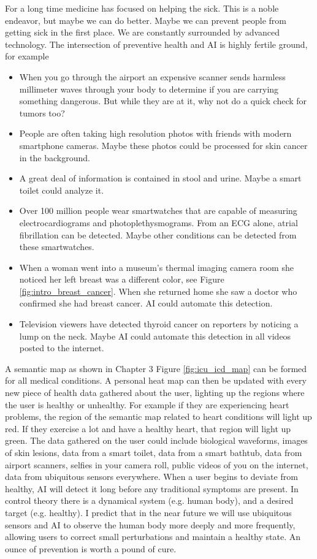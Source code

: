 For a long time medicine has focused on helping the sick.  This is a noble endeavor, but maybe we can do better.  Maybe we can prevent people from getting sick in the first place.  We are constantly surrounded by advanced technology.  The intersection of preventive health and AI is highly fertile ground, for example

\begin{itemize}
    \item When you go through the airport an expensive scanner sends harmless millimeter waves through your body to determine if you are carrying something dangerous.  But while they are at it, why not do a quick check for tumors too?
    \item People are often taking high resolution photos with friends with modern smartphone cameras.  Maybe these photos could be processed for skin cancer in the background.
    \item A great deal of information is contained in stool and urine.  Maybe a smart toilet could analyze it.
    \item Over 100 million people wear smartwatches that are capable of measuring electrocardiograms and photoplethysmograms.  From an ECG alone, atrial fibrillation can be detected.  Maybe other conditions can be detected from these smartwatches.
    \item When a woman went into a museum's thermal imaging camera room she noticed her left breast was a different color, see Figure \ref{fig:intro_breast_cancer}. When she returned home she saw a doctor who confirmed she had breast cancer.  AI could automate this detection.
    \item Television viewers have detected thyroid cancer on reporters by noticing a lump on the neck.  Maybe AI could automate this detection in all videos posted to the internet.
\end{itemize}

A semantic map as shown in Chapter 3 Figure \ref{fig:icu_icd_map} can be formed for all medical conditions.  A personal heat map can then be updated with every new piece of health data gathered about the user, lighting up the regions where the user is healthy or unhealthy.  For example if they are experiencing heart problems, the region of the semantic map related to heart conditions will light up red.  If they exercise a lot and have a healthy heart, that region will light up green.  The data gathered on the user could include biological waveforms, images of skin lesions, data from a smart toilet, data from a smart bathtub, data from airport scanners, selfies in your camera roll, public videos of you on the internet, data from ubiquitous sensors everywhere.  When a user begins to deviate from healthy, AI will detect it long before any traditional symptoms are present.  In control theory there is a dynamical system (e.g. human body), and a desired target (e.g. healthy). I predict that in the near future we will use ubiquitous sensors and AI to observe the human body more deeply and more frequently, allowing users to correct small perturbations and maintain a healthy state.  An ounce of prevention is worth a pound of cure.